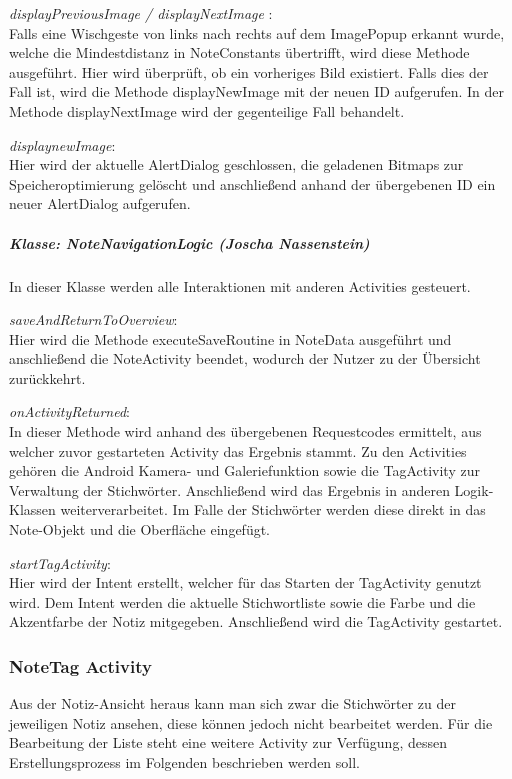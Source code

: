 \textit{displayPreviousImage / displayNextImage }:\\
Falls eine Wischgeste von links nach rechts auf dem ImagePopup erkannt wurde, welche die Mindestdistanz in NoteConstants übertrifft, wird diese Methode ausgeführt. Hier wird überprüft, ob ein vorheriges Bild existiert. Falls dies der Fall ist, wird die Methode displayNewImage mit der neuen ID aufgerufen. In der Methode displayNextImage wird der gegenteilige Fall behandelt.

\textit{displaynewImage}:\\
Hier wird der aktuelle AlertDialog geschlossen, die geladenen Bitmaps zur Speicheroptimierung gelöscht und anschließend anhand der übergebenen ID ein neuer AlertDialog aufgerufen.

\subparagraph*{Klasse: NoteNavigationLogic (Joscha Nassenstein)}
In dieser Klasse werden alle Interaktionen mit anderen Activities gesteuert.

\textit{saveAndReturnToOverview}:\\
Hier wird die Methode executeSaveRoutine in NoteData ausgeführt und anschließend die NoteActivity beendet, wodurch der Nutzer zu der Übersicht zurückkehrt.

\textit{onActivityReturned}:\\
In dieser Methode wird anhand des übergebenen Requestcodes ermittelt, aus welcher zuvor gestarteten Activity das Ergebnis stammt. Zu den Activities gehören die Android Kamera- und Galeriefunktion sowie die TagActivity zur Verwaltung der Stichwörter. Anschließend wird das Ergebnis in anderen Logik-Klassen weiterverarbeitet. Im Falle der Stichwörter werden diese direkt in das Note-Objekt und die Oberfläche eingefügt.

\textit{startTagActivity}:\\
Hier wird der Intent erstellt, welcher für das Starten der TagActivity genutzt wird. Dem Intent werden die aktuelle Stichwortliste sowie die Farbe und die Akzentfarbe der Notiz mitgegeben. Anschließend wird die TagActivity gestartet.

\subsubsection{NoteTag Activity}
Aus der Notiz-Ansicht heraus kann man sich zwar die Stichwörter zu der jeweiligen Notiz ansehen, diese können jedoch nicht bearbeitet werden. Für die Bearbeitung der Liste steht eine weitere Activity zur Verfügung, dessen Erstellungsprozess im Folgenden beschrieben werden soll.

